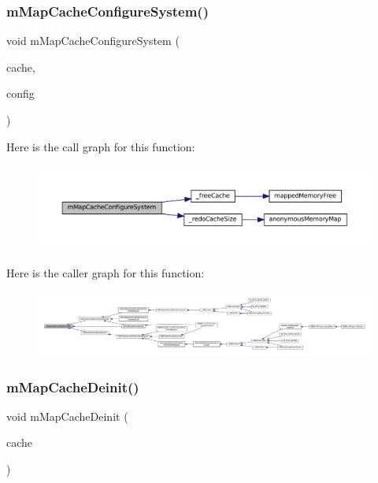 \subsubsection{\texorpdfstring{m\+Map\+Cache\+Configure\+System()}{mMapCacheConfigureSystem()}}
{\footnotesize\ttfamily void m\+Map\+Cache\+Configure\+System (\begin{DoxyParamCaption}\item[{struct m\+Map\+Cache $\ast$}]{cache,  }\item[{m\+Map\+Cache\+System\+Info}]{config }\end{DoxyParamCaption})}

Here is the call graph for this function\+:
\nopagebreak
\begin{figure}[H]
\begin{center}
\leavevmode
\includegraphics[width=350pt]{map-cache_8c_a4da999fdbbac1c998ca0e5299d56db70_cgraph}
\end{center}
\end{figure}
Here is the caller graph for this function\+:
\nopagebreak
\begin{figure}[H]
\begin{center}
\leavevmode
\includegraphics[width=350pt]{map-cache_8c_a4da999fdbbac1c998ca0e5299d56db70_icgraph}
\end{center}
\end{figure}
\mbox{\label{map-cache_8c_a5d53da29354cc88338a70840e6c60971}} 
\subsubsection{\texorpdfstring{m\+Map\+Cache\+Deinit()}{mMapCacheDeinit()}}
{\footnotesize\ttfamily void m\+Map\+Cache\+Deinit (\begin{DoxyParamCaption}\item[{struct m\+Map\+Cache $\ast$}]{cache }\end{DoxyParamCaption})}

